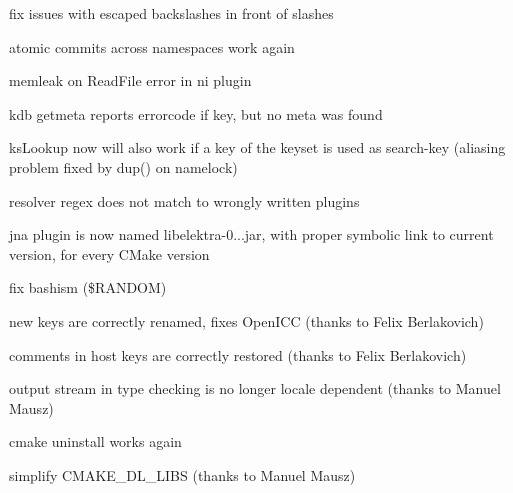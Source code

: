 \begin{DoxyItemize}
\item fix issues with escaped backslashes in front of slashes
\item atomic commits across namespaces work again
\item memleak on Read\+File error in ni plugin
\item {\ttfamily kdb getmeta} reports errorcode if key, but no meta was found
\item {\ttfamily ks\+Lookup} now will also work if a key of the keyset is used as search-\/key (aliasing problem fixed by dup() on namelock)
\item resolver regex does not match to wrongly written plugins
\item jna plugin is now named libelektra-\/0...\+jar, with proper symbolic link to current version, for every C\+Make version
\item fix bashism ({\ttfamily \$\+R\+A\+N\+D\+OM})
\item new keys are correctly renamed, fixes Open\+I\+CC (thanks to Felix Berlakovich)
\item comments in host keys are correctly restored (thanks to Felix Berlakovich)
\item output stream in type checking is no longer locale dependent (thanks to Manuel Mausz)
\item cmake uninstall works again
\item simplify {\ttfamily C\+M\+A\+K\+E\+\_\+\+D\+L\+\_\+\+L\+I\+BS} (thanks to Manuel Mausz)
\end{DoxyItemize}


